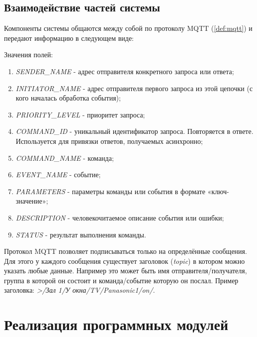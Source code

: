 \subsection{Взаимодействие частей системы}

Компоненты системы общаются между собой по протоколу MQTT (\ref{def:mqtt}) и передают информацию в следующем виде:





\noindent Значения полей:

\begin{enumerate}
    \item \textit{SENDER\_NAME} - адрес отправителя конкретного запроса или ответа;
    \item \textit{INITIATOR\_NAME} - адрес отправителя первого запроса из этой цепочки (с кого началась обработка события);
    \item \textit{PRIORITY\_LEVEL} - приоритет запроса;
    \item \textit{COMMAND\_ID} - уникальный идентификатор запроса. Повторяется в ответе.
    Используется для привязки ответов, получаемых асинхронно;
    \item \textit{COMMAND\_NAME} - команда;
    \item \textit{EVENT\_NAME} - событие;
    \item \textit{PARAMETERS} - параметры команды или события в формате «ключ-значение»;
    \item \textit{DESCRIPTION} - человекочитаемое описание события или ошибки;
    \item \textit{STATUS} - результат выполнения команды.
\end{enumerate}

\noindent Протокол MQTT позволяет подписываться только на определённые сообщения. Для этого у каждого сообщения существует
заголовок (\textit{topic}) в котором можно указать любые данные. Например это может быть имя отправителя/получателя,
группа в которой он состоит и команда/событие которую он послал. Пример заголовка: \textit{>/Зал 1/У окна/TV/Panasonic1/on/}.

\clearpage

\section{Реализация программных модулей}

